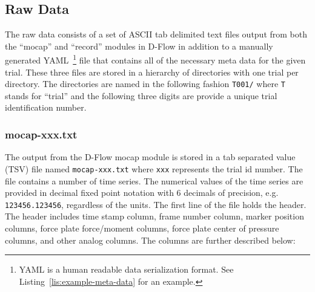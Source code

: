 \documentclass[fleqn,12pt]{wlpeerj}
\begin{document}
\subsection*{Raw Data}
%
The raw data consists of a set of ASCII tab delimited text files output from
both the ``mocap'' and ``record'' modules in D-Flow in addition to a manually
generated YAML~\footnote{YAML is a human readable data serialization format.
See Listing~\ref{lis:example-meta-data} for an example.} file that contains all
of the necessary meta data for the given trial. These three files are stored
in a hierarchy of directories with one trial per directory. The directories are
named in the following fashion \verb+T001/+ where \verb+T+ stands for ``trial''
and the following three digits are provide a unique trial identification
number.

\subsubsection*{mocap-xxx.txt}
%
The output from the D-Flow mocap module is stored in a tab separated value
(TSV) file named \verb+mocap-xxx.txt+ where \verb+xxx+ represents the trial id
number. The file contains a number of time series. The numerical values of the
time series are provided in decimal fixed point notation with 6 decimals of
precision, e.g. \verb|123456.123456|, regardless of the units. The first line
of the file holds the header. The header includes time stamp column, frame
number column, marker position columns, force plate force/moment columns, force
plate center of pressure columns, and other analog columns. The columns are
further described below:
%
\end{document}
